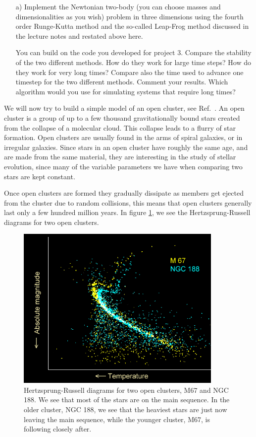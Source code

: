 \documentclass[10pt]{article}
\begin{document}
\begin{enumerate}
\item[a)] Implement the Newtonian two-body (you can choose masses and dimensionalities as
  you wish) problem in three dimensions using the fourth order
  Runge-Kutta method and the so-called Leap-Frog method discussed in
  the lecture notes and restated above here.

You can build on the code you developed for project 3. Compare the
stability of the two different methods. How do they work for large
time steps? How do they work for very long times? Compare also the
time used to advance one timestep for the two different
methods. Comment your results. Which algorithm would you use for
simulating systems that require long  times?
\end{enumerate}

We will now try to build a simple model of an open
cluster, see Ref.~\cite{openclusterref}. An
open cluster is a group of up to a few thousand gravitationally bound
stars created from the collapse of a molecular cloud. This collapse
leads to a flurry of star formation. Open clusters are usually found
in the arms of spiral galaxies, or in irregular galaxies. Since stars
in an open cluster have roughly the same age, and are made from the
same material, they are interesting in the study of stellar evolution,
since many of the variable parameters we have when comparing two stars
are kept constant.

Once open clusters are formed they gradually dissipate as members get
ejected from the cluster due to random collisions, this means that
open clusters generally last only a few hundred million years. In
figure \ref{HR}, we see the Hertzsprung-Russell diagrams for two open
clusters.

\begin{figure}[!h]
\centering
\includegraphics[width=10cm]{Open_cluster_HR_diagram_ages.png}
\caption{Hertzsprung-Russell diagrams for two open clusters, M67 and
  NGC 188. We see that most of the stars are on the main sequence. In
  the older cluster, NGC 188, we see that the heaviest stars are just
  now leaving the main sequence, while the younger cluster, M67, is
  following closely after.}
\label{HR}
\end{figure}
\end{document}
